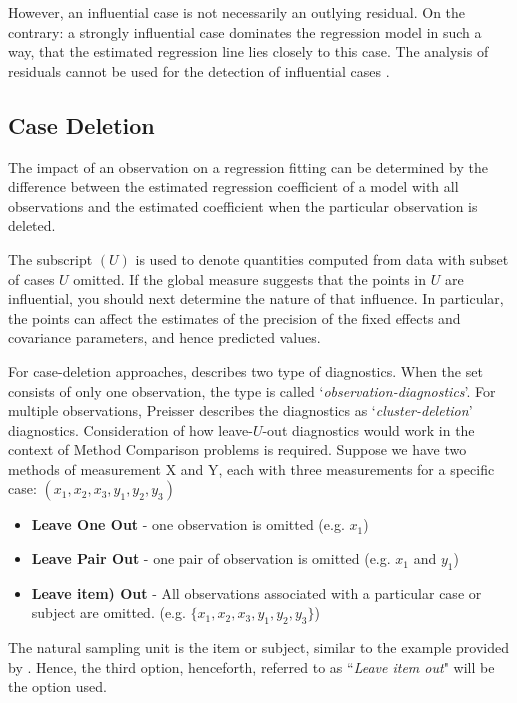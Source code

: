 \documentclass[12pt, a4paper]{report}
\theoremstyle{definition}
\theoremstyle{remark}
\begin{document}
However, an influential case is not necessarily an outlying residual. On the contrary: a strongly influential case dominates
the regression model in such a way, that the estimated regression line lies closely to this case. The analysis of residuals cannot be used for the detection of influential cases \citep{crawley2012r}.







\subsection*{Case Deletion}

The impact of an observation on a regression fitting can be determined by the difference between the estimated regression coefficient of a model with all observations and the estimated coefficient when the particular observation is deleted. 

The subscript $(U)$ is used to denote quantities computed from data with subset of cases $U$ omitted.
If the global measure suggests that the points in $U$ are influential, you should next determine the nature of
that influence. In particular, the points can affect the estimates of the precision of the fixed effects and covariance parameters, and hence predicted values.


For case-deletion approaches, \citet{preisser} describes two type of diagnostics. When the set consists of only one observation, the type is called
`\textit{observation-diagnostics}'. For multiple observations, Preisser describes the diagnostics as `\textit{cluster-deletion}' diagnostics. Consideration of how leave-$U$-out diagnostics would work in the context of Method Comparison problems is required.  Suppose we have two methods of measurement X and Y, each with three measurements for a specific case: $(x_1,x_2,x_3,y_1,y_2,y_3)$

\begin{itemize}
\item \textbf{Leave One Out} - one observation is omitted (e.g. $x_1$)
\item \textbf{Leave Pair Out} - one pair of observation  is omitted (e.g. $x_1$ and $y_1$)
\item \textbf{Leave item) Out} - All observations associated with a particular case or subject are omitted. (e.g. $\{x_1,x_2,x_3,y_1,y_2,y_3\}$)
\end{itemize}

The natural sampling unit is the item or subject, similar to the example provided by \citet{schabenberger}. Hence, the third option, henceforth, referred to as ``\textit{Leave item out}" will be the option used.
\end{document}
